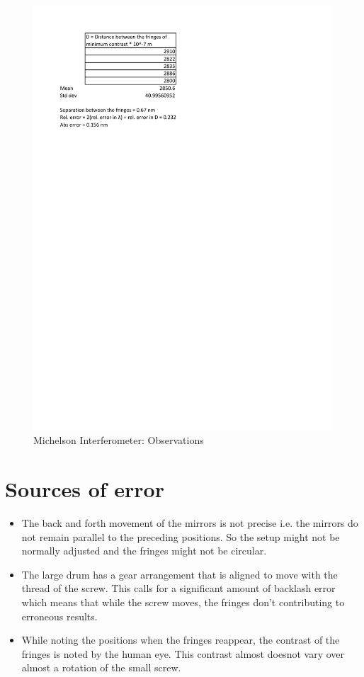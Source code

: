 	\begin{figure}[bth]
		\begin{center}
			\includegraphics[width=1.3\linewidth]{gfx/1_obsB}
		\end{center}
		\caption[Observations for $\lambda_\text{difference}0$]{Michelson Interferometer: Observations}
	\label{1_observations2}
	\end{figure}


\section{Sources of error}
	\begin{itemize}
		\item The back and  forth movement of the mirrors is not precise i.e. the mirrors do not remain parallel to the preceding positions. So the setup might not be normally adjusted and the fringes might not be circular.
		\item The large drum has a gear arrangement that is aligned to move with the thread of the screw. This calls for a significant amount of backlash error which means that while the screw moves, the fringes don't contributing to erroneous results.
		\item While noting the positions when the fringes reappear, the contrast of the fringes is noted by the human eye. This contrast almost doesnot vary over almost a rotation of the small screw. 
	\end{itemize}

